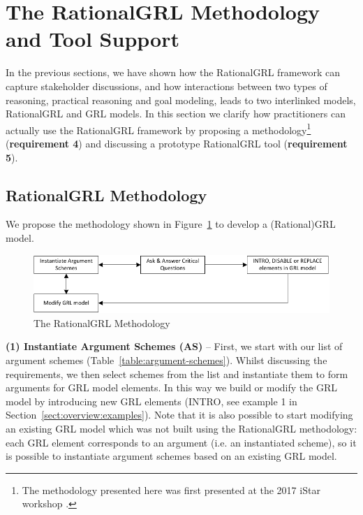 \section{The RationalGRL Methodology and Tool Support}
\label{sect:tool}

In the previous sections, we have shown how the RationalGRL framework can capture stakeholder discussions, and how interactions between two types of reasoning, practical reasoning and goal modeling, leads to two interlinked models, RationalGRL and GRL models. In this section we clarify how practitioners can actually use the RationalGRL framework by proposing a methodology\footnote{The methodology presented here was first presented at the 2017 iStar workshop \cite{iSTar}.} (\textbf{requirement 4}) and discussing a prototype RationalGRL tool (\textbf{requirement 5}).

\subsection{RationalGRL Methodology}
\label{sect:methodology} 

We propose the methodology shown in Figure~\ref{fig:rationalgrl-methodology} to develop a (Rational)GRL model. %

\begin{figure}[ht]
\centering
\includegraphics{img/methodology.pdf}
\caption{The RationalGRL Methodology}
\label{fig:rationalgrl-methodology}
\end{figure}

\textbf{(1) Instantiate Argument Schemes (AS)} -- First, we start with our list of argument schemes (Table~\ref{table:argument-schemes}). Whilst discussing the requirements, we then select schemes from the list and instantiate them to form arguments for GRL model elements. In this way we build or modify the GRL model by introducing new GRL elements (\textsf{INTRO}, see example 1 in Section~\ref{sect:overview:examples}). Note that it is also possible to start modifying an existing GRL model which was not built using the RationalGRL methodology: each GRL element corresponds to an argument (i.e. an instantiated scheme), so it is possible to instantiate argument schemes based on an existing GRL model. 

